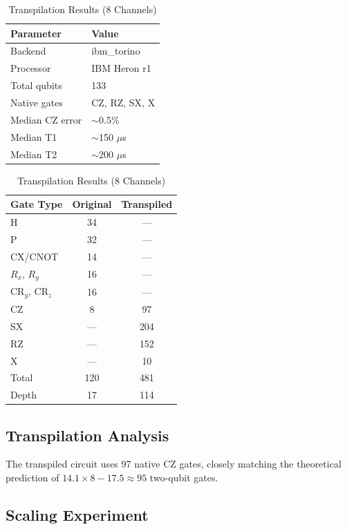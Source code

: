 \documentclass[11pt,a4paper]{article}
\begin{document}
\begin{table}[h!]
\centering
\begin{minipage}{0.42\textwidth}
\centering
\caption{IBM Quantum Hardware Specifications}
\label{tab:hardware}
\begin{tabular}{ll}
\toprule
Parameter & Value \\
\midrule
Backend & ibm\_torino \\
Processor & IBM Heron r1 \\
Total qubits & 133 \\
Native gates & CZ, RZ, SX, X \\
Median CZ error & $\sim$0.5\% \\
Median T1 & $\sim$150 $\mu$s \\
Median T2 & $\sim$200 $\mu$s \\
\bottomrule
\end{tabular}
\end{minipage}
\hfill
\begin{minipage}{0.54\textwidth}
\centering
\caption{Transpilation Results (8 Channels)}
\label{tab:transpile}
\begin{tabular}{lcc}
\toprule
Gate Type & Original & Transpiled \\
\midrule
H & 34 & --- \\
P & 32 & --- \\
CX/CNOT & 14 & --- \\
$R_x$, $R_y$ & 16 & --- \\
CR$_y$, CR$_z$ & 16 & --- \\
CZ & 8 & 97 \\
SX & --- & 204 \\
RZ & --- & 152 \\
X & --- & 10 \\
\midrule
Total & 120 & 481 \\
Depth & 17 & 114 \\
\bottomrule
\end{tabular}
\end{minipage}
\end{table}

\subsection{Transpilation Analysis}

The transpiled circuit uses 97 native CZ gates, closely matching the theoretical prediction of $14.1 \times 8 - 17.5 \approx 95$ two-qubit gates.

\subsection{Scaling Experiment}
\end{document}
